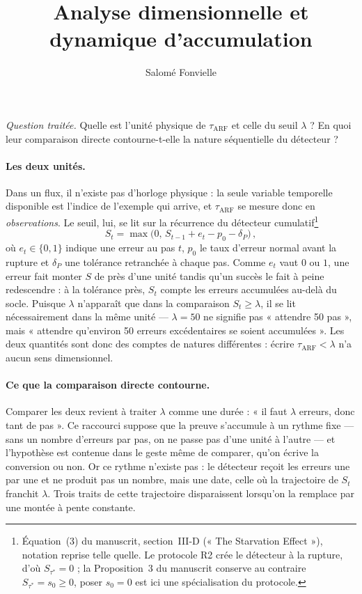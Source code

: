 \documentclass[10pt,a4paper]{article}
\title{Analyse dimensionnelle et dynamique d'accumulation}
\author{Salomé Fonvielle}
\date{}
\begin{document}
\maketitle

\noindent\emph{Question traitée.} Quelle est l'unité physique de $\tau_{\mathrm{ARF}}$
et celle du seuil $\lambda$ ? En quoi leur comparaison directe contourne-t-elle la
nature séquentielle du détecteur ?

\paragraph{Les deux unités.} Dans un flux, il n'existe pas d'horloge physique : la
seule variable temporelle disponible est l'indice de l'exemple qui arrive, et
$\tau_{\mathrm{ARF}}$ se mesure donc en \emph{observations}. Le seuil, lui, se lit sur
la récurrence du détecteur cumulatif\footnote{Équation~(3) du manuscrit, section~III-D
(« The Starvation Effect »), notation reprise telle quelle. Le protocole R2 crée le
détecteur à la rupture, d'où $S_{\tau^*} = 0$ ; la Proposition~3 du manuscrit conserve
au contraire $S_{\tau^*} = s_0 \ge 0$, poser $s_0 = 0$ est ici une spécialisation du
protocole.}
\begin{equation}
  S_t = \max\bigl(0,\, S_{t-1} + e_t - p_0 - \delta_P\bigr)\,,
  \label{eq:cusum}
\end{equation}
où $e_t \in \{0,1\}$ indique une erreur au pas $t$, $p_0$ le taux d'erreur normal avant
la rupture et $\delta_P$ une tolérance retranchée à chaque pas. Comme $e_t$ vaut $0$ ou
$1$, une erreur fait monter $S$ de près d'une unité tandis qu'un succès le fait à peine
redescendre : à la tolérance près, $S_t$ compte les erreurs accumulées au-delà du socle.
Puisque $\lambda$ n'apparaît que dans la comparaison $S_t \ge \lambda$, il se lit
nécessairement dans la même unité --- $\lambda = 50$ ne signifie pas « attendre 50 pas »,
mais « attendre qu'environ 50 erreurs excédentaires se soient accumulées ». Les deux
quantités sont donc des comptes de natures différentes : écrire
$\tau_{\mathrm{ARF}} < \lambda$ n'a aucun sens dimensionnel.

\paragraph{Ce que la comparaison directe contourne.} Comparer les deux revient à traiter
$\lambda$ comme une durée : « il faut $\lambda$ erreurs, donc tant de pas ». Ce raccourci
suppose que la preuve s'accumule à un rythme fixe --- sans un nombre d'erreurs par pas,
on ne passe pas d'une unité à l'autre --- et l'hypothèse est contenue dans le geste même
de comparer, qu'on écrive la conversion ou non. Or ce rythme n'existe pas : le détecteur
reçoit les erreurs une par une et ne produit pas un nombre, mais une date, celle où la
trajectoire de $S_t$ franchit $\lambda$. Trois traits de cette trajectoire disparaissent
lorsqu'on la remplace par une montée à pente constante.
\end{document}
